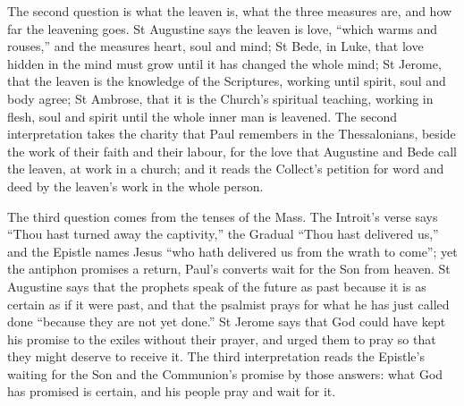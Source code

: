 The second question is what the leaven is, what the three measures are, and
how far the leavening goes. St Augustine says the leaven is love, ``which
warms and rouses,'' and the measures heart, soul and mind; St Bede, in Luke,
that love hidden in the mind must grow until it has changed the whole mind;
St Jerome, that the leaven is the knowledge of the Scriptures, working until
spirit, soul and body agree; St Ambrose, that it is the Church's spiritual
teaching, working in flesh, soul and spirit until the whole inner man is
leavened. The second interpretation takes the charity that Paul remembers in
the Thessalonians, beside the work of their faith and their labour, for the
love that Augustine and Bede call the leaven, at work in a church; and it
reads the Collect's petition for word and deed by the leaven's work in the
whole person.

The third question comes from the tenses of the Mass. The Introit's verse says
``Thou hast turned away the captivity,'' the Gradual ``Thou hast delivered
us,'' and the Epistle names Jesus ``who hath delivered us from the wrath to
come''; yet the antiphon promises a return, Paul's converts wait for the Son
from heaven. St Augustine says that the prophets speak of the future as past because
it is as certain as if it were past, and that the psalmist prays for what he
has just called done ``because they are not yet done.'' St Jerome says that
God could have kept his promise to the exiles without their prayer, and urged
them to pray so that they might deserve to receive it. The third interpretation reads
the Epistle's waiting for the Son and the Communion's promise by those
answers: what God has promised is certain, and his people pray and wait for
it.

